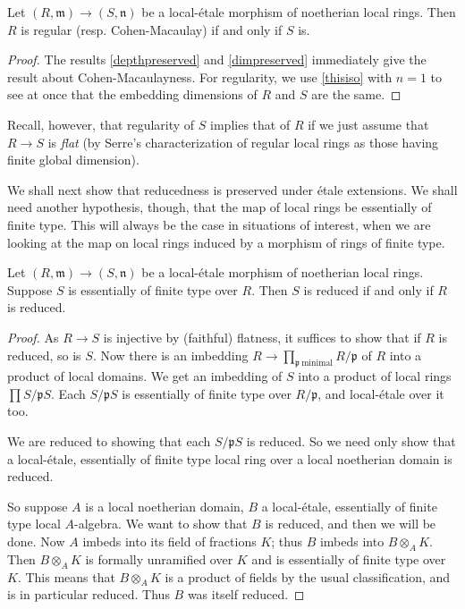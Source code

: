 \begin{corollary} 
Let $(R, \mathfrak{m}) \to (S, \mathfrak{n})$ be a local-\'etale morphism of noetherian local
rings. 
Then $R$ is regular (resp. Cohen-Macaulay) if and only if $S$ is.
\end{corollary} 
\begin{proof} 
The  results \cref{depthpreserved} and \cref{dimpreserved} immediately give
the result about Cohen-Macaulayness.
For regularity, we use \eqref{thisiso} with $n=1$ to see at once that the
embedding dimensions of $R$ and $S$ are the same.
\end{proof} 

Recall, however, that regularity of $S$ implies that of $R$ if we just assume
that $R \to S$ is \emph{flat} (by Serre's characterization of regular
local rings as those having finite global dimension).


We shall next show that reducedness is preserved
under \'etale extensions.
We shall need another hypothesis, though, that the map of local rings 
be essentially of finite type.
This will always be the case in situations of interest, when we are looking at
the map on local rings induced by a morphism of rings of finite type.

\begin{proposition} 
\label{reducedetale}
Let $(R, \mathfrak{m}) \to (S, \mathfrak{n})$ be a local-\'etale morphism of noetherian local
rings. 
Suppose $S$ is essentially of finite type over $R$.
Then $S$ is reduced if and only if $R$ is reduced.
\end{proposition} 
\begin{proof} 
As $R \to S$ is injective by (faithful) flatness, it suffices to show that if
$R$ is reduced, so is $S$.
Now there is an imbedding $R \to \prod_{\mathfrak{p} \ \mathrm{minimal}}
R/\mathfrak{p}$ of $R$ into a product of local domains. We get an imbedding of
$S$ into a product of local rings $\prod S/\mathfrak{p}S$.
Each $S/\mathfrak{p}S$ is essentially of finite type over $R/\mathfrak{p}$,
and local-\'etale over it too.

We are reduced to showing that each $S/\mathfrak{p}S$ is reduced. So we need
only show that a local-\'etale, essentially of finite type local ring over a
local noetherian domain is reduced. 

So suppose $A$ is a local noetherian domain, $B$ a 
local-\'etale, essentially of finite type local $A$-algebra.
We want to show that $B$ is reduced, and then we will be done. Now $A$ imbeds into its field of
fractions $K$; thus $B$ imbeds into $B \otimes_A K$. 
Then $B \otimes_A K$ is formally unramified over $K$ and is essentially of
finite type over $K$. This means that $B \otimes_A K$ is a product of fields
by the usual classification, and is in particular reduced. Thus $B$ was itself
reduced.
\end{proof} 



